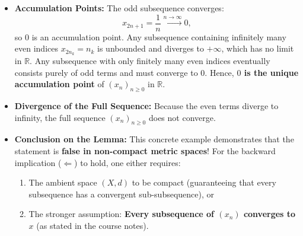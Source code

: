 \begin{content}

\begin{steps}
\begin{itemize}
    \item \textbf{Accumulation Points:} 
    The odd subsequence converges:
    \[
    x_{2n+1} = \frac{1}{n} \xrightarrow{n \to \infty} 0,
    \]
    so $0$ is an accumulation point. Any subsequence containing infinitely many even indices $x_{2n_k} = n_k$ is unbounded and diverges to $+\infty$, which has no limit in $\mathbb{R}$. Any subsequence with only finitely many even indices eventually consists purely of odd terms and must converge to $0$. Hence, \textbf{$0$ is the unique accumulation point} of $(x_n)_{n \ge 0}$ in $\mathbb{R}$.

    \item \textbf{Divergence of the Full Sequence:} 
    Because the even terms diverge to infinity, the full sequence $(x_n)_{n \ge 0}$ does not converge.

    \item \textbf{Conclusion on the Lemma:} 
    This concrete example demonstrates that the statement  is \textbf{false in non-compact metric spaces}! For the backward implication ($\Longleftarrow$) to hold, one either requires:
    \begin{enumerate}[label=\textbf{(\alph*)}]
        \item The ambient space $(X, d)$ to be compact (guaranteeing that every subsequence has a convergent sub-subsequence), or
        \item The stronger assumption: \textbf{Every subsequence of $(x_n)$ converges to $x$} (as stated in the course notes).
    \end{enumerate}
\end{itemize}
\end{steps}
\end{content}

